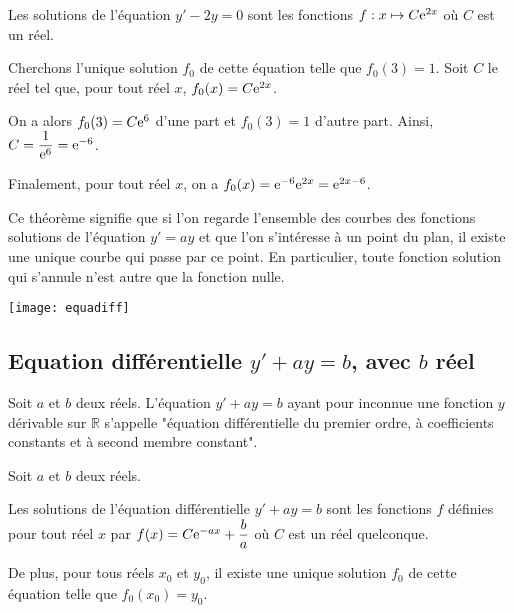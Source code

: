 \documentclass[11pt,fleqn, openany]{book} %
\begin{document}
\begin{example} Les solutions de l'équation $y'-2y=0$ sont les fonctions $f:x\mapsto C\mathrm{e}^{2x}$ où $C$ est un réel.

Cherchons l'unique solution $f_0$ de cette équation telle que $f_0(3)=1$. Soit $C$ le réel tel que, pour tout réel $x$, $f_0(x)=C\mathrm{e}^{2x}$.

On a alors $f_0(3)=C\mathrm{e}^{6}$ d'une part et $f_0(3)=1$ d'autre part. Ainsi, $C=\dfrac{1}{\mathrm{e}^6}=\mathrm{e}^{-6}$. 

Finalement, pour tout réel $x$, on a $f_0(x)=\mathrm{e}^{-6}\mathrm{e}^{2x}=\mathrm{e}^{2x-6}$.\end{example}

Ce théorème signifie que si l'on regarde l'ensemble des courbes des fonctions solutions de l'équation $y'=ay$ et que l'on s'intéresse à un point du plan, il existe une unique courbe qui passe par ce point. En particulier, toute fonction solution qui s'annule n'est autre que la fonction nulle.

\begin{center}
\texttt{[image: equadiff]}
\end{center}

\subsection{Equation différentielle $y'+ay=b$, avec $b$ réel}

\begin{definition} Soit $a$ et $b$ deux réels. L'équation $y'+ay=b$ ayant pour inconnue une fonction $y$ dérivable sur $\mathbb{R}$ s'appelle  "équation différentielle du premier ordre, à coefficients constants et à second membre constant".\end{definition}

\begin{proposition}Soit $a$ et $b$ deux réels.

Les solutions de l'équation différentielle $y'+ay=b$ sont les fonctions $f$ définies pour tout réel $x$ par $f(x)=C\mathrm{e}^{-ax}+\dfrac{b}{a}$ où $C$ est un réel quelconque.

De plus, pour tous réels $x_0$ et $y_0$, il existe une unique solution $f_0$ de cette équation telle que $f_0(x_0)=y_0$.\end{proposition}
\end{document}
